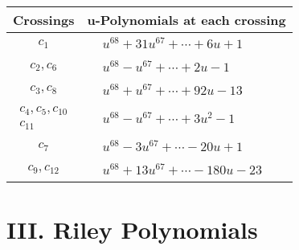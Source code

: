 \documentclass[1p]{elsarticle_modified}
\theoremstyle{definition}
\begin{document}
\begin{tabular}{m{50pt}|m{274pt}}
Crossings & \hspace{64pt}u-Polynomials at each crossing \\
\hline $$\begin{aligned}c_{1}\end{aligned}$$&$\begin{aligned}
&u^{68}+31 u^{67}+\cdots+6 u+1
\end{aligned}$\\
\hline $$\begin{aligned}c_{2},c_{6}\end{aligned}$$&$\begin{aligned}
&u^{68}- u^{67}+\cdots+2 u-1
\end{aligned}$\\
\hline $$\begin{aligned}c_{3},c_{8}\end{aligned}$$&$\begin{aligned}
&u^{68}+u^{67}+\cdots+92 u-13
\end{aligned}$\\
\hline $$\begin{aligned}c_{4},c_{5},c_{10}\\c_{11}\end{aligned}$$&$\begin{aligned}
&u^{68}- u^{67}+\cdots+3 u^2-1
\end{aligned}$\\
\hline $$\begin{aligned}c_{7}\end{aligned}$$&$\begin{aligned}
&u^{68}-3 u^{67}+\cdots-20 u+1
\end{aligned}$\\
\hline $$\begin{aligned}c_{9},c_{12}\end{aligned}$$&$\begin{aligned}
&u^{68}+13 u^{67}+\cdots-180 u-23
\end{aligned}$\\
\hline
\end{tabular}\newpage\renewcommand{\arraystretch}{1}
\centering \section*{ III. Riley Polynomials}
\end{document}
